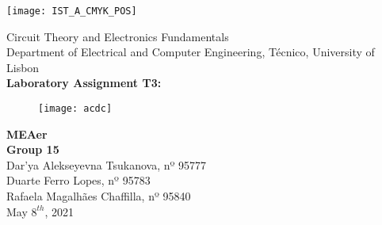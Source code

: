 
\thispagestyle {empty}

\texttt{[image: IST\_A\_CMYK\_POS]}

\begin{center}
%
\vspace{1.0cm}

\vspace{1cm}
{\FontLb Circuit Theory and Electronics Fundamentals} \\ %
\vspace{1cm}
{\FontSn Department of Electrical and Computer Engineering, Técnico, University of Lisbon} \\ %
\vspace{1cm}
{\FontSn \textbf{Laboratory Assignment T3:}} \\
\vspace{1cm}
\begin{figure}[h] \centering
	\texttt{[image: acdc]}
	\label{fig:acdcband}
\end{figure}
{\FontSn \textbf{MEAer}} \\ %
\vspace{1cm}
{\FontSn \textbf{Group 15}} \\
\vspace{.5cm}
{\FontSn Dar'ya Alekseyevna Tsukanova, nº 95777} \\
{\FontSn Duarte Ferro Lopes, nº 95783} \\
{\FontSn Rafaela Magalhães Chaffilla, nº 95840} \\
\vspace{1cm}
{\FontSn May $8^{th}$, 2021} \\ %
%
\end{center}



